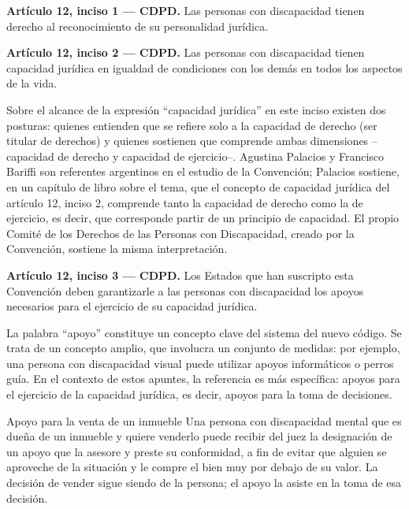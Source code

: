 \documentclass[12pt,oneside]{book}
\begin{document}
\begin{important}
\textbf{Artículo 12, inciso 1 --- CDPD.} Las personas con discapacidad tienen derecho al reconocimiento de su personalidad jurídica.
\end{important}

\begin{important}
\textbf{Artículo 12, inciso 2 --- CDPD.} Las personas con discapacidad tienen capacidad jurídica en igualdad de condiciones con los demás en todos los aspectos de la vida.
\end{important}

Sobre el alcance de la expresión ``capacidad jurídica'' en este inciso existen dos posturas: quienes entienden que se refiere solo a la capacidad de derecho (ser titular de derechos) y quienes sostienen que comprende ambas dimensiones --capacidad de derecho y capacidad de ejercicio--. Agustina Palacios y Francisco Bariffi son referentes argentinos en el estudio de la Convención; Palacios sostiene, en un capítulo de libro sobre el tema, que el concepto de capacidad jurídica del artículo 12, inciso 2, comprende tanto la capacidad de derecho como la de ejercicio, es decir, que corresponde partir de un principio de capacidad. El propio Comité de los Derechos de las Personas con Discapacidad, creado por la Convención, sostiene la misma interpretación.

\begin{important}
\textbf{Artículo 12, inciso 3 --- CDPD.} Los Estados que han suscripto esta Convención deben garantizarle a las personas con discapacidad los apoyos necesarios para el ejercicio de su capacidad jurídica.
\end{important}

La palabra ``apoyo'' constituye un concepto clave del sistema del nuevo código. Se trata de un concepto amplio, que involucra un conjunto de medidas: por ejemplo, una persona con discapacidad visual puede utilizar apoyos informáticos o perros guía. En el contexto de estos apuntes, la referencia es más específica: apoyos para el ejercicio de la capacidad jurídica, es decir, apoyos para la toma de decisiones.

\begin{example}{Apoyo para la venta de un inmueble}
Una persona con discapacidad mental que es dueña de un inmueble y quiere venderlo puede recibir del juez la designación de un apoyo que la asesore y preste su conformidad, a fin de evitar que alguien se aproveche de la situación y le compre el bien muy por debajo de su valor. La decisión de vender sigue siendo de la persona; el apoyo la asiste en la toma de esa decisión.
\end{example}
\end{document}

